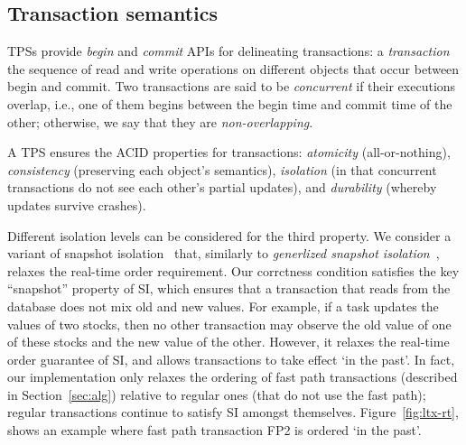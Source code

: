 \subsection{Transaction semantics} \label{ssec:transactions}

TPSs provide \emph{begin} and \emph{commit} APIs for delineating transactions: 
a \emph{transaction} the sequence of read and write operations on different objects 
that occur between begin and commit. Two transactions are said to be \emph{concurrent} if 
their executions overlap, i.e., one of them begins between the begin time and commit time of the other;
otherwise, we say that they are \emph{non-overlapping}.

A TPS  ensures the ACID properties for transactions:
\emph{atomicity} (all-or-nothing), \emph{consistency} (preserving each object's semantics), 
\emph{isolation} (in that concurrent transactions do not see each other's partial updates), and 
\emph{durability} (whereby updates survive crashes).

Different isolation levels can be considered for the third property. We consider a variant of 
snapshot isolation~\cite{DBLP:conf/sigmod/BerensonBGMOO95} that, similarly to \emph{generlized snapshot isolation}~\cite{DBLP:conf/srds/ElniketyZP05}, relaxes  the real-time order requirement. 
Our corrctness condition satisfies the key ``snapshot'' property of SI, which ensures that a transaction 
that reads from the database does not mix old and new values. For example, if a task updates the values of two stocks, 
then no other transaction may observe the old value of one of these stocks and the new value of the other.
However, it relaxes the real-time order guarantee of SI, and allows transactions to take effect `in the past'.  
In fact, our implementation only relaxes the ordering of fast path  transactions (described in Section~\ref{sec:alg}) 
relative to regular ones (that do not use the fast path); regular transactions continue to satisfy SI amongst themselves. 
Figure~\ref{fig:ltx-rt}, shows an example where fast path transaction FP2 is ordered `in the past'.

